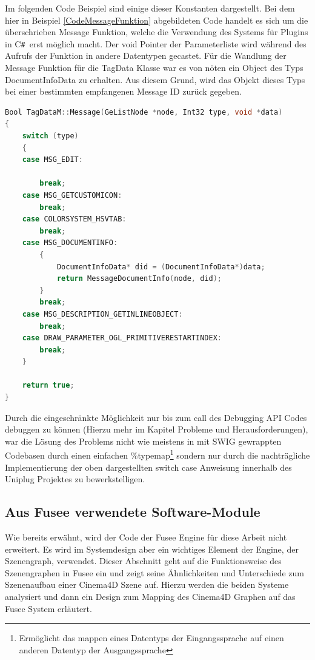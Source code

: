 \documentclass[pagesize, paper=a4, fontsize=12pt, titlepage=true, headings=small, headnosepline, abstractoff, liststotoc, nochapterprefix, plainheadsepline, twoside]{scrreprt}
\newcommand{\CSS}{C\texttt{\# }}
\begin{document}
Im folgenden Code Beispiel sind einige dieser Konstanten dargestellt. Bei dem hier in Beispiel \ref{CodeMessageFunktion} abgebildeten Code handelt es sich um die überschrieben Message Funktion, welche die Verwendung des Systems für Plugins in \CSS erst möglich macht. Der void Pointer der Parameterliste wird während des Aufrufs der Funktion in andere Datentypen gecastet. Für die Wandlung der Message Funktion für die TagData Klasse war es von nöten ein Object des Typs DocumentInfoData zu erhalten. Aus diesem Grund, wird das Objekt dieses Typs bei einer bestimmten empfangenen Message ID zurück gegeben.
\begin{lstlisting}[language=C++, caption = Überschreiben der Message Funktion des TagData Datentyps, label=CodeMessageFunktion]
Bool TagDataM::Message(GeListNode *node, Int32 type, void *data)
{
	switch (type)
	{
	case MSG_EDIT:

		break;
	case MSG_GETCUSTOMICON:
		break;
	case COLORSYSTEM_HSVTAB:
		break;
	case MSG_DOCUMENTINFO:
		{
			DocumentInfoData* did = (DocumentInfoData*)data;
			return MessageDocumentInfo(node, did);
		}
		break;
	case MSG_DESCRIPTION_GETINLINEOBJECT:
		break;
	case DRAW_PARAMETER_OGL_PRIMITIVERESTARTINDEX:
		break;
	}

	return true;
}
\end{lstlisting}

Durch die eingeschränkte  Möglichkeit nur bis zum call des Debugging API Codes debuggen zu können (Hierzu mehr im Kapitel Probleme und Herausforderungen), war die Lösung des Problems nicht wie meistens in mit SWIG gewrappten Codebasen durch einen einfachen \%typemap\footnote{Ermöglicht das mappen eines Datentyps der Eingangssprache auf einen anderen Datentyp der Ausgangssprache} sondern nur durch die nachträgliche Implementierung der oben dargestellten switch case Anweisung innerhalb des Uniplug Projektes zu bewerkstelligen. 

\subsection{Aus Fusee verwendete Software-Module}
Wie bereits erwähnt, wird der Code der Fusee Engine für diese Arbeit nicht erweitert. Es wird im Systemdesign aber ein wichtiges Element der Engine, der Szenengraph, verwendet. Dieser Abschnitt geht auf die Funktionsweise des Szenengraphen in Fusee ein und zeigt seine Ähnlichkeiten und Unterschiede zum Szenenaufbau einer Cinema4D Szene auf. Hierzu werden die beiden Systeme analysiert und dann ein Design zum Mapping des Cinema4D Graphen auf das Fusee System erläutert.
\end{document}

